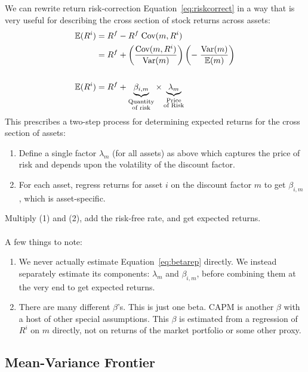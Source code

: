 \documentclass[a4paper,12pt]{scrartcl}
\begin{document}
We can rewrite return risk-correction Equation~\ref{eq:riskcorrect} in a
way that is very useful for describing the cross section of stock
returns across assets:
\begin{align}
  \mathbb{E}(R^i) &=  R^f - R^f \; \text{Cov}(m,R^i) \notag\\
  &=  R^f + \left(\frac{\text{Cov}(m,R^i)}{\text{Var}(m)}\right)
  \left(-\;\frac{\text{Var}(m)}{\mathbb{E}(m)}\right)\notag\\\notag\\
  \mathbb{E}(R^i)
  &=  R^f +
  \underbrace{\beta_{i,m}}_{\substack{\text{Quantity}\\\text{of risk}}}
  \times
  \underbrace{\lambda_m}_{\substack{\text{Price}\\\text{of Risk}}}
  \label{eq:betarep}
\end{align}
This prescribes a two-step process for determining expected returns for
the cross section of assets:
\begin{enumerate}
  \item Define a single factor $\lambda_m$ (for all assets) as above
    which captures the price of risk and depends upon the volatility of
    the discount factor.

  \item For each asset, regress returns for asset $i$ on the discount
    factor $m$ to get $\beta_{i,m}$, which is asset-specific.
\end{enumerate}
Multiply (1) and (2), add the risk-free rate, and get expected returns.
\\
\\
A few things to note:
\begin{enumerate}
  \item We never actually estimate Equation~\ref{eq:betarep} directly.
    We instead separately estimate its components: $\lambda_m$ and
    $\beta_{i,m}$, before combining them at the very end to get
    expected returns.
  \item There are many different $\beta$'s. This is just one beta. CAPM
    is another $\beta$ with a host of other special assumptions. This
    $\beta$ is estimated from a regression of $R^i$ on $m$ directly, not
    on returns of the market portfolio or some other proxy.
\end{enumerate}


\subsection{Mean-Variance Frontier}
\end{document}
